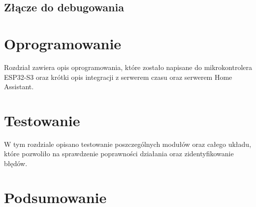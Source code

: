 \documentclass[twoside]{article}
\begin{document}
\subsection{Złącze do debugowania}

\newpage

\section{Oprogramowanie}
Rozdział zawiera opis oprogramowania, które zostało napisane do mikrokontrolera ESP32-S3 oraz krótki opis integracji z serwerem czasu oraz serwerem Home Assistant.

\section{Testowanie}
W tym rozdziale opisano testowanie poszczególnych modułów oraz całego układu, które pozwoliło na sprawdzenie poprawności działania oraz zidentyfikowanie błędów.

\section{Podsumowanie}
 
\newpage

\printbibliography[]
\newpage
\listoffigures
{}
\newpage
\listoftables
{}
\end{document}
